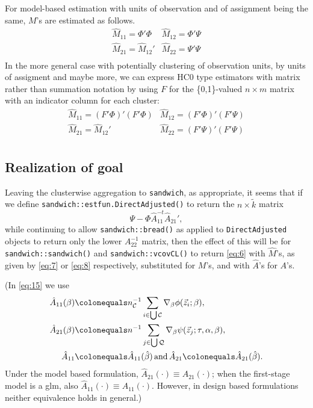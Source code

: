 \documentclass{article}
\newcommand{\defeq}{\ensuremath{\colonequals}}
\begin{document}
For model-based estimation with units of observation and of assignment being
the same, $M$'s are estimated as follows. 
\begin{equation}\label{eq:7}
  \begin{array}{cc}
  \hat{M}_{11} =\Phi'\Phi & \hat{M}_{12} = \Phi'\Psi\\
    \hat{M}_{21} =\hat{M}_{12}' & \hat{M}_{22}= \Psi'\Psi\\
    \end{array} 
  \end{equation}
  In the more general case with potentially clustering of observation
units, by units of assigment and maybe more, we can express HC0
type estimators with matrix rather than summation notation by using
$F$ for the \{0,1\}-valued $n \times m$ matrix with an indicator
column for each cluster:
\begin{equation} \label{eq:8}
  \begin{array}{cc}
  \hat{M}_{11} =(F'\Phi)'(F'\Phi) & \hat{M}_{12} = (F'\Phi)'(F'\Psi)\\
    \hat{M}_{21} =\hat{M}_{12}' & \hat{M}_{22}= (F'\Psi)'(F'\Psi)\\
    \end{array}
  \end{equation}

\subsection{Realization of goal}
Leaving the clusterwise aggregation to \texttt{sandwich}, as
appropriate, it seems that if we define
\texttt{sandwich::estfun.DirectAdjusted()} to return the $n \times \tilde{k}$ matrix
\begin{equation} \label{eq:15}
  \Psi - \Phi\hat{A}_{11}^{-t}\hat{A}_{21}', 
\end{equation}
while continuing to allow \texttt{sandwich::bread()} as applied to
\texttt{DirectAdjusted} objects to return only
the lower $A_{22}^{-1}$ matrix, then the effect of this will be for \texttt{sandwich::sandwich()}
and \texttt{sandwich::vcovCL()} to return \eqref{eq:6} with
$\hat{M}$'s,  as
given by \eqref{eq:7} or \eqref{eq:8} respectively, substituted for
$M$'s, and with $\hat{A}$'s for $A$'s.

(In \eqref{eq:15}
we use
\begin{align*}
  \hat{A}_{11}(\beta) &\defeq  n_{\mathcal{C}}^{-1}\sum_{i\in \bigcup
        \mathcal{C}}\nabla_{\beta}\phi(\vec{z}_{i};
        \beta ),\\
  \hat{A}_{21}(\beta) &\defeq n^{-1}\sum_{j\in \bigcup
        \mathcal{Q}}\nabla_{\beta}\psi(\vec{z}_{j};
        \tau, \alpha, \beta ),\\
  \hat{A}_{11}&\defeq \hat{A}_{11}(\hat\beta)\, \text{and}\, \hat{A}_{21}\defeq \hat{A}_{21}(\hat\beta).
\end{align*}
Under the model based
formulation, $\hat{A}_{21}(\cdot) \equiv {A}_{21}(\cdot)$; when the
first-stage model is a glm, also $\hat{A}_{11}(\cdot) \equiv
{A}_{11}(\cdot)$.  However, in design based formulations neither
equivalence holds in general.)
\end{document}
